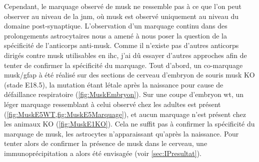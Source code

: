 	Cependant, le marquage observé de \gls{musk} ne ressemble pas à ce que l'on peut observer au niveau de la \gls{jnm}, où \gls{musk} est observé uniquement au niveau du domaine post-synaptique. L'observation d'un marquage continu dans des prolongements astrocytaires nous a amené à nous poser la question de la spécificité de l'anticorps anti-\gls{musk}. Comme il n'existe pas d'autres anticorps dirigés contre \gls{musk} utilisables en \gls{ihc}, j'ai dû essayer d'autres approches afin de tenter de confirmer la spécificité du marquage. Tout d'abord, un co-marquage \gls{musk}/\acrshort{gfap} à été réalisé sur des sections de cerveau d'embryon de souris \gls{musk} KO (stade E18.5), la mutation étant létale après la naissance pour cause de défaillance respiratoire (\cref{fig:MuskEmbryon}). Sur une coupe d'embryon \gls{wt}, un léger marquage ressemblant à celui observé chez les adultes est présent (\cref{fig:MuskE5WT,fig:MuskE5Marquage}), et aucun marquage n'est présent chez les animaux KO (\cref{fig:MuskE1KO}). Cela ne suffit pas à confirmer la spécificité du marquage de \gls{musk}, les astrocytes n'apparaissant qu'après la naissance. Pour tenter alors de confirmer la présence de \gls{musk} dans le cerveau, une immunoprécipitation a alors été envisagée (voir \cref{sec:IPresultat}).
	
